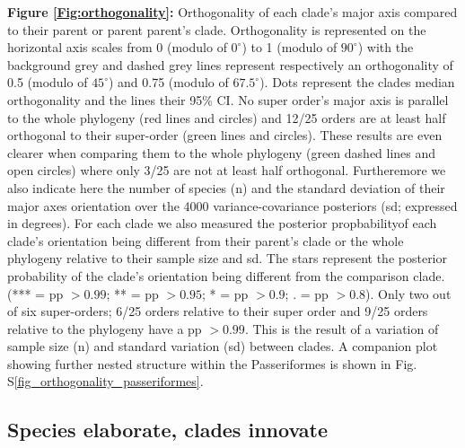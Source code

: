 \documentclass[12pt,letterpaper]{article}
\begin{document}
\noindent \textbf{Figure \ref{Fig:orthogonality}:}
Orthogonality of each clade's major axis compared to their parent or parent parent's clade.
Orthogonality is represented on the horizontal axis scales from 0 (modulo of $0^\circ$) to 1 (modulo of $90^\circ$) with the background grey and dashed grey lines represent respectively an orthogonality of 0.5 (modulo of $45^\circ$) and 0.75 (modulo of $67.5^\circ$).
Dots represent the clades median orthogonality and the lines their 95\% CI.
No super order's major axis is parallel to the whole phylogeny (red lines and circles) and 12/25 orders are at least half orthogonal to their super-order (green lines and circles).
These results are even clearer when comparing them to the whole phylogeny (green dashed lines and open circles) where only 3/25 are not at least half orthogonal.
Furtheremore we also indicate here the number of species (n) and the standard deviation of their major axes orientation over the 4000 variance-covariance posteriors (sd; expressed in degrees).
For each clade we also measured the posterior propbabilityof each clade's orientation being different from their parent's clade or the whole phylogeny relative to their sample size and sd.
The stars represent the posterior probability of the clade's orientation being different from the comparison clade. (*** = pp $> 0.99$; ** = pp $>0.95$; * = pp $> 0.9$; . = pp $> 0.8$).
Only two out of six super-orders; 6/25 orders relative to their super order and 9/25 orders relative to the phylogeny have a pp $> 0.99$.
This is the result of a variation of sample size (n) and standard variation (sd) between clades. 
A companion plot showing further nested structure within the Passeriformes is shown in Fig. S\ref{fig_orthogonality_passeriformes}.







\subsection{Species elaborate, clades innovate}
\end{document}
